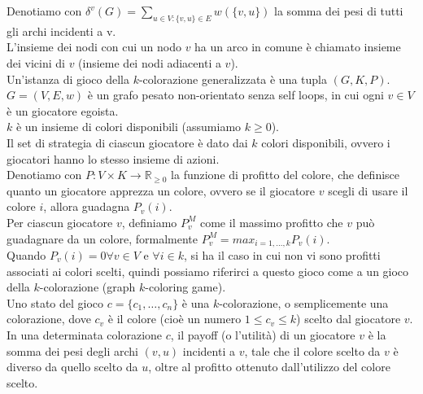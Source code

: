 Denotiamo con \(\delta^v (G) = \sum_{u \in V : \{v, u\} \in E} w(\{v, u\})\) la somma dei pesi di tutti gli archi incidenti a v.\\

L'insieme dei nodi con cui un nodo \(v\) ha un arco in comune è chiamato insieme dei vicini di \(v\) (insieme dei nodi adiacenti a \(v\)).\\

Un'istanza di gioco della \(k\)-colorazione generalizzata è una tupla \((G, K, P)\). \(G = (V, E, w)\) è un grafo pesato non-orientato senza self loops, in cui ogni \(v \in V\) è un giocatore egoista.\\

\(k\) è un insieme di colori disponibili (assumiamo \(k \geq 0\)).\\

Il set di strategia di ciascun giocatore è dato dai \(k\) colori disponibili, ovvero i giocatori hanno lo stesso insieme di azioni.\\

Denotiamo con \(P : V \times K \rightarrow \mathds{R}_{\geq 0}\) la funzione di profitto del colore, che definisce quanto un giocatore apprezza un colore, ovvero se il giocatore \(v\) scegli di usare il colore \(i\), allora guadagna \(P_v (i)\).\\

Per ciascun giocatore \(v\), definiamo \(P_v^M\) come il massimo profitto che \(v\) può guadagnare da un colore, formalmente \(P_v^M = max_{i=1,\ldots,k} P_v (i)\).\\

Quando \(P_v (i) = 0 \forall v \in V\) e \(\forall i \in k\), si ha il caso in cui non vi sono profitti associati ai colori scelti, quindi possiamo riferirci a questo gioco come a un gioco della \(k\)-colorazione (graph \(k\)-coloring game).\\

Uno stato del gioco \(c = \{c_1,\ldots,c_n\}\) è una \(k\)-colorazione, o semplicemente una colorazione, dove \(c_v\) è il colore (cioè un numero \(1 \leq c_v \leq k\)) scelto dal giocatore \(v\).\\

In una determinata colorazione \(c\), il payoff (o l'utilità) di un giocatore \(v\) è la somma dei pesi degli archi \((v, u)\) incidenti a \(v\), tale che il colore scelto da \(v\) è diverso da quello scelto da \(u\), oltre al profitto ottenuto dall'utilizzo del colore scelto.\\

